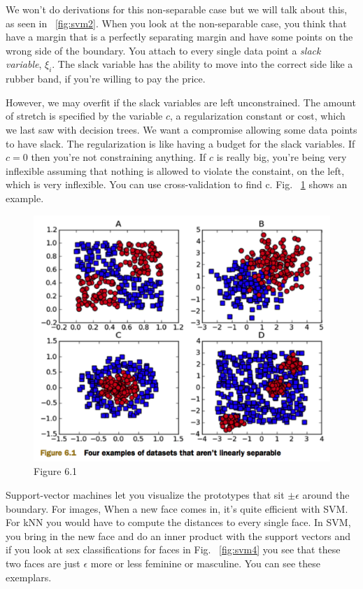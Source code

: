 \documentclass[a4paper]{article}
\begin{document}
We won't do derivations for this non-separable case but we will talk about this, as seen in ~\ref{fig:svm2}.  When you look at the non-separable case, you think that have a margin that is a perfectly separating margin and have some points on the wrong side of the boundary.  You attach to every single data point a \textit{slack variable}, $\xi_i$.  The slack variable has the ability to move into the correct side like a rubber band, if you're willing to pay the price.

However, we may overfit if the slack variables are left unconstrained.  The amount of stretch is specified by the variable $c$, a regularization constant or cost, which we last saw with decision trees.  We want a compromise allowing some data points to have slack.  The regularization is like having a budget for the slack variables.  If $c=0$ then you're not constraining anything.  If $c$ is really big, you're being very inflexible assuming that nothing is allowed to violate the constaint, on the left, which is very inflexible.  You can use cross-validation to find c.  Fig. ~\ref{fig:svm3} shows an example.

\begin{figure}
\centering
\includegraphics[width=1.0\textwidth]{fig6_1.png}
\caption{\label{fig:svm3}Figure 6.1}
\end{figure}

Support-vector machines let you visualize the prototypes that sit $\pm \epsilon$ around the boundary.  For images, When a new face comes in, it's quite efficient with SVM.  For kNN you would have to compute the distances to every single face.  In SVM, you bring in the new face and do an inner product with the support vectors and if you look at sex classifications for faces in Fig. ~\ref{fig:svm4} you see that these two faces are just $\epsilon$ more or less feminine or masculine.  You can see these exemplars.
\end{document}
